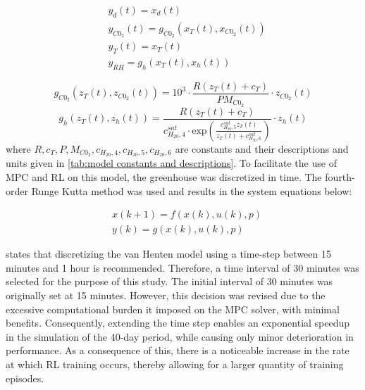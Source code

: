 \begin{equation}
	\begin{aligned}
		& y_d(t) = x_d(t) 
		\\
		& y_{C0_2}(t) = g_{C0_2}(x_T(t),x_{C0_2}(t))
		\\
		& y_T (t) = x_T(t)
		\\
		& y_{RH} = g_h (x_T(t),x_h(t))
	\end{aligned}
\end{equation}

\begin{equation}
	g_{C0_2}(z_T(t),z_{C0_2}(t)) = 10^3 \cdot \frac{R(z_T(t) + c_T)}{PM_{C0_2}} \cdot z_{C0_2}(t)
\end{equation}
\begin{equation}
	g_h (z_T(t),z_h(t)) = \frac{R(z_T(t) + c_T)}{c_{H_20,4}^{sat}\cdot \text{exp}(\frac{c_{H_20,5}^{sat}z_T(t)}{z_T(t) + c_{H_20,6}^{sat}})} \cdot z_{h}(t)
\end{equation}
where $R,c_T,P,M_{C0_2},c_{H_20,4},c_{H_20,5},c_{H_20,6}$ are constants and their descriptions and units given in \autoref{tab:model constants and descriptions}. To facilitate the use of MPC and RL on this model, the greenhouse was discretized in time. The fourth-order Runge Kutta method was used and results in the system equations below:

\begin{equation}\label{eq:greenhouse_model_discrete}
	\begin{aligned}
		& x(k+1) = f(x(k),u(k),p) \\
		& y(k) = g(x(k),u(k),p)
	\end{aligned}
\end{equation}

\cite{vanstratenUserAcceptedOptimal2000} states that discretizing the van Henten model using a time-step between 15 minutes and 1 hour is recommended. Therefore, a time interval of 30 minutes was selected for the purpose of this study. 
The initial interval of 30 minutes was originally set at 15 minutes. However, this decision was revised due to the excessive computational burden it imposed on the MPC solver, with minimal benefits. Consequently, extending the time step enables an exponential speedup in the simulation of the 40-day period, while causing only minor deterioration in performance. As a consequence of this, there is a noticeable increase in the rate at which RL training occurs, thereby allowing for a larger quantity of training episodes.



